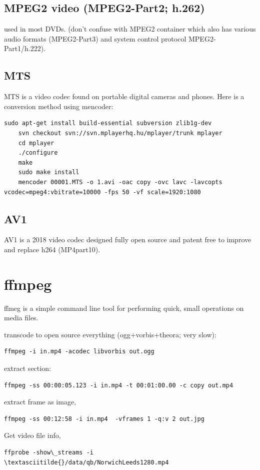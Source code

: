 \documentclass[oneside,english]{scrbook}
\begin{document}
\section{MPEG2 video (MPEG2-Part2; h.262)}
used in most DVDs.    (don't confuse with MPEG2 container which also has various audio formats (MPEG2-Part3) and system control protocol MPEG2-Part1/h.222).

\section{MTS}
MTS is a video codec found on portable digital cameras and phones.
Here is a conversion method using mencoder:

\begin{lstlisting}
sudo apt-get install build-essential subversion zlib1g-dev
	svn checkout svn://svn.mplayerhq.hu/mplayer/trunk mplayer
	cd mplayer
	./configure
	make
	sudo make install
	mencoder 00001.MTS -o 1.avi -oac copy -ovc lavc -lavcopts vcodec=mpeg4:vbitrate=10000 -fps 50 -vf scale=1920:1080
\end{lstlisting}

\section{AV1}
AV1 is a 2018 video codec designed fully open source and patent free to improve and replace h264 (MP4part10).

\chapter{ffmpeg}

ffmeg is a simple command line tool for performing quick, small operations on media files.

transcode to open source everything (ogg+vorbis+theora; very slow):
\begin{lstlisting}
ffmpeg -i in.mp4 -acodec libvorbis out.ogg
\end{lstlisting}

extract section: 
\begin{lstlisting}
ffmpeg -ss 00:00:05.123 -i in.mp4 -t 00:01:00.00 -c copy out.mp4 
\end{lstlisting}

extract frame as image,
\begin{lstlisting}
ffmpeg -ss 00:12:58 -i in.mp4  -vframes 1 -q:v 2 out.jpg
\end{lstlisting}

Get video file info,
\begin{lstlisting}
ffprobe -show\_streams -i \textasciitilde{}/data/qb/NorwichLeeds1280.mp4
\end{lstlisting}
\end{document}
